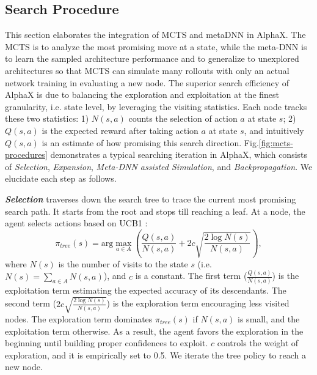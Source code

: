 \documentclass[10pt,twocolumn,letterpaper]{article}
\begin{document}
\subsection{Search Procedure}

\label{sec:search}

This section elaborates the integration of MCTS and metaDNN in AlphaX. The MCTS is to analyze the most promising move at a state, while the meta-DNN is to learn the sampled architecture performance and to generalize to unexplored architectures so that MCTS can simulate many rollouts with only an actual network training in evaluating a new node. The superior search efficiency of AlphaX is due to balancing the exploration and exploitation at the finest granularity, i.e. state level, by leveraging the visiting statistics. Each node tracks these two statistics: 1) $N(s, a)$ counts the selection of action $a$ at state $s$; 2) $Q(s, a)$ is the expected reward after taking action $a$ at state $s$, and intuitively $Q(s, a)$ is an estimate of how promising this search direction. Fig.\ref{fig:mcts-procedures} demonstrates a typical searching iteration in AlphaX, which consists of \textit{Selection}, \textit{Expansion}, \textit{Meta-DNN assisted Simulation}, and \textit{Backpropagation}. We elucidate each step as follows.



\textbf{\textit{Selection}} traverses down the search tree to trace the current most promising search path. It starts from the root and stops till reaching a leaf. At a node, the agent selects actions based on UCB1 \cite{auer2002finite}:
\begin{equation}
	\label{ucb1_update}
	\pi_{tree}(s) = \text{arg}\max_{a \in A} \left( \frac{Q(s, a)}{N(s, a)} + 2 c \sqrt{\frac{2 \log N(s)}{N(s, a)}} \right),
\end{equation}
where $N(s)$ is the number of visits to the state $s$ (i.e. $N(s) = \sum_{a \in A} N(s, a)$), and $c$ is a constant. The first term ($\frac{Q(s, a)}{N(s, a)} $) is the exploitation term estimating the expected accuracy of its descendants. The second term ($2 c \sqrt{\frac{2 \log N(s)}{N(s, a)}}$) is the exploration term encouraging less visited nodes. The exploration term dominates $\pi_{tree}(s)$ if $N(s, a)$ is small, and the exploitation term otherwise. As a result, the agent favors the exploration in the beginning until building proper confidences to exploit. $c$ controls the weight of exploration, and it is empirically set to 0.5. We iterate the tree policy to reach a new node.
\end{document}
